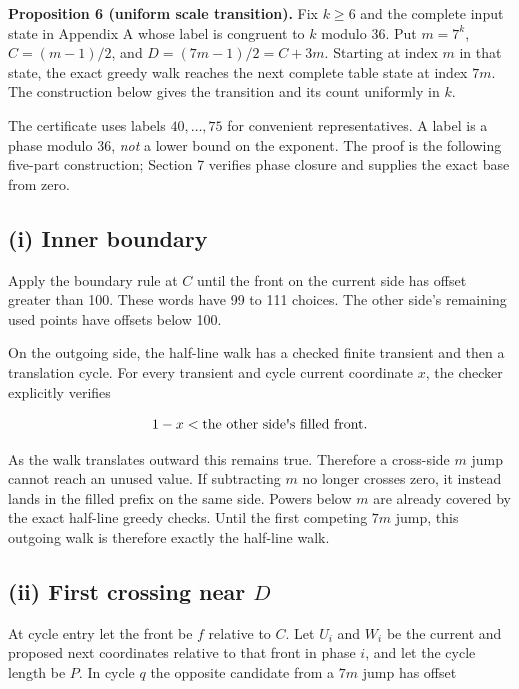 \documentclass[11pt,a4paper]{article}
\begin{document}
\noindent\textbf{Proposition 6 (uniform scale transition).} Fix $k\ge6$
and the complete input state in Appendix A whose label is congruent to
$k$ modulo 36. Put $m=7^k$, $C=(m-1)/2$, and $D=(7m-1)/2=C+3m$.
Starting at index $m$ in that state, the exact greedy walk reaches the
next complete table state at index $7m$. The construction below gives
the transition and its count uniformly in $k$.

The certificate uses labels $40,\ldots,75$ for convenient representatives.
A label is a phase modulo 36, \emph{not} a lower bound on the exponent.
The proof is the following five-part construction; Section 7 verifies
phase closure and supplies the exact base from zero.

\subsection*{(i) Inner boundary}

Apply the boundary rule at $C$ until the front on the current side has offset greater than 100. These words have 99 to 111 choices. The other side's remaining used points have offsets below 100.

On the outgoing side, the half-line walk has a checked finite transient and then a translation cycle. For every transient and cycle current coordinate $x$, the checker explicitly verifies

\begin{equation*}
1-x<\text{the other side\textquotesingle s filled front}.
\end{equation*}

As the walk translates outward this remains true. Therefore a cross-side $m$ jump cannot reach an unused value. If subtracting $m$ no longer crosses zero, it instead lands in the filled prefix on the same side. Powers below $m$ are already covered by the exact half-line greedy checks. Until the first competing $7m$ jump, this outgoing walk is therefore exactly the half-line walk.

\subsection*{(ii) First crossing near $D$}

At cycle entry let the front be $f$ relative to $C$. Let $U_i$ and $W_i$ be the current and proposed next coordinates relative to that front in phase $i$, and let the cycle length be $P$. In cycle $q$ the opposite candidate from a $7m$ jump has offset
\end{document}
